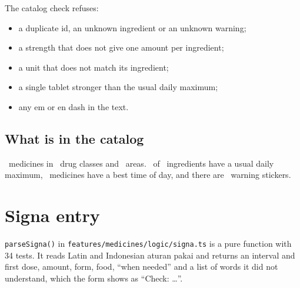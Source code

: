 \documentclass[11pt]{article}
\begin{document}
The catalog check refuses:
\begin{itemize}
  \item a duplicate id, an unknown ingredient or an unknown warning;
  \item a strength that does not give one amount per ingredient;
  \item a unit that does not match its ingredient;
  \item a single tablet stronger than the usual daily maximum;
  \item any em or en dash in the text.
\end{itemize}

\subsection{What is in the catalog}
\begin{center}
\end{center}
\CatalogDrugs\ medicines in \CatalogClasses\ drug classes and \CatalogAreas\ areas. \CatalogIngredientsWithLimit\ of \CatalogIngredients\ ingredients have a usual daily maximum, \CatalogTimingRules\ medicines have a best time of day, and there are \CatalogWarnings\ warning stickers.

\section{Signa entry}
\texttt{parseSigna()} in \texttt{features/medicines/logic/signa.ts} is a pure function with 34 tests. It reads Latin and Indonesian aturan pakai and returns an interval and first dose, amount, form, food, ``when needed'' and a list of words it did not understand, which the form shows as ``Check: \dots''.
\end{document}
